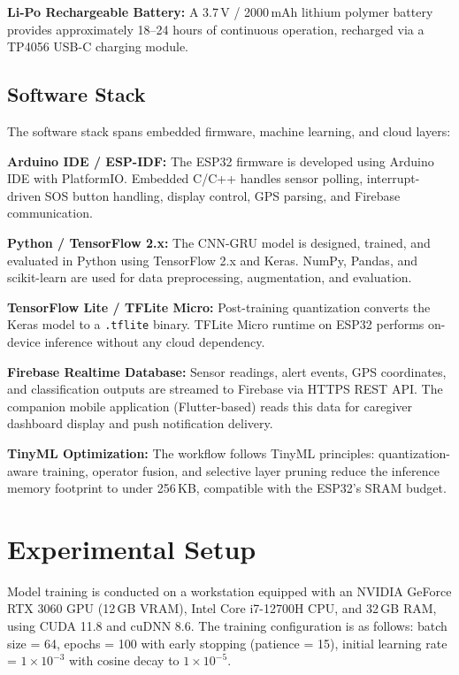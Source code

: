 \documentclass[conference]{IEEEtran}
\begin{document}
\textbf{Li-Po Rechargeable Battery:} A 3.7\,V / 2000\,mAh lithium polymer battery provides approximately 18--24 hours of continuous operation, recharged via a TP4056 USB-C charging module.

\subsection{Software Stack}

The software stack spans embedded firmware, machine learning, and cloud layers:

\textbf{Arduino IDE / ESP-IDF:} The ESP32 firmware is developed using Arduino IDE with PlatformIO. Embedded C/C++ handles sensor polling, interrupt-driven SOS button handling, display control, GPS parsing, and Firebase communication.

\textbf{Python / TensorFlow 2.x:} The CNN-GRU model is designed, trained, and evaluated in Python using TensorFlow 2.x and Keras. NumPy, Pandas, and scikit-learn are used for data preprocessing, augmentation, and evaluation.

\textbf{TensorFlow Lite / TFLite Micro:} Post-training quantization converts the Keras model to a \texttt{.tflite} binary. TFLite Micro runtime on ESP32 performs on-device inference without any cloud dependency.

\textbf{Firebase Realtime Database:} Sensor readings, alert events, GPS coordinates, and classification outputs are streamed to Firebase via HTTPS REST API. The companion mobile application (Flutter-based) reads this data for caregiver dashboard display and push notification delivery.

\textbf{TinyML Optimization:} The workflow follows TinyML principles: quantization-aware training, operator fusion, and selective layer pruning reduce the inference memory footprint to under 256\,KB, compatible with the ESP32's SRAM budget.

\section{Experimental Setup}

Model training is conducted on a workstation equipped with an NVIDIA GeForce RTX 3060 GPU (12\,GB VRAM), Intel Core i7-12700H CPU, and 32\,GB RAM, using CUDA 11.8 and cuDNN 8.6. The training configuration is as follows: batch size = 64, epochs = 100 with early stopping (patience = 15), initial learning rate = $1 \times 10^{-3}$ with cosine decay to $1 \times 10^{-5}$.
\end{document}
